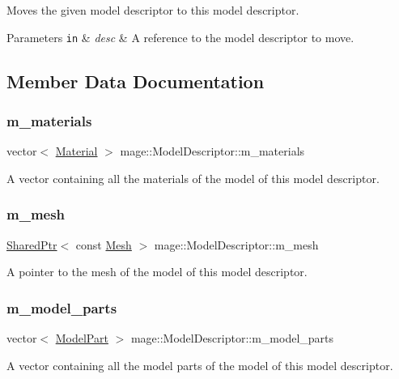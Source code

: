Moves the given model descriptor to this model descriptor.


\begin{DoxyParams}[1]{Parameters}
\mbox{\tt in}  & {\em desc} & A reference to the model descriptor to move. \\
\hline
\end{DoxyParams}


\subsection{Member Data Documentation}
\hypertarget{classmage_1_1_model_descriptor_a672238b257f99836243d84f634ffeea2}{}\label{classmage_1_1_model_descriptor_a672238b257f99836243d84f634ffeea2} 
\subsubsection{\texorpdfstring{m\+\_\+materials}{m\_materials}}
{\footnotesize\ttfamily vector$<$ \hyperlink{classmage_1_1_material}{Material} $>$ mage\+::\+Model\+Descriptor\+::m\+\_\+materials\hspace{0.3cm}{\ttfamily [private]}}

A vector containing all the materials of the model of this model descriptor. \hypertarget{classmage_1_1_model_descriptor_a675b02d184e775c03c05006f8fa9aeb4}{}\label{classmage_1_1_model_descriptor_a675b02d184e775c03c05006f8fa9aeb4} 
\subsubsection{\texorpdfstring{m\+\_\+mesh}{m\_mesh}}
{\footnotesize\ttfamily \hyperlink{namespacemage_a1e01ae66713838a7a67d30e44c67703e}{Shared\+Ptr}$<$ const \hyperlink{classmage_1_1_mesh}{Mesh} $>$ mage\+::\+Model\+Descriptor\+::m\+\_\+mesh\hspace{0.3cm}{\ttfamily [private]}}

A pointer to the mesh of the model of this model descriptor. \hypertarget{classmage_1_1_model_descriptor_a200c6e44c9b6a5bde5c8490fb93ba00f}{}\label{classmage_1_1_model_descriptor_a200c6e44c9b6a5bde5c8490fb93ba00f} 
\subsubsection{\texorpdfstring{m\+\_\+model\+\_\+parts}{m\_model\_parts}}
{\footnotesize\ttfamily vector$<$ \hyperlink{structmage_1_1_model_part}{Model\+Part} $>$ mage\+::\+Model\+Descriptor\+::m\+\_\+model\+\_\+parts\hspace{0.3cm}{\ttfamily [private]}}

A vector containing all the model parts of the model of this model descriptor. 